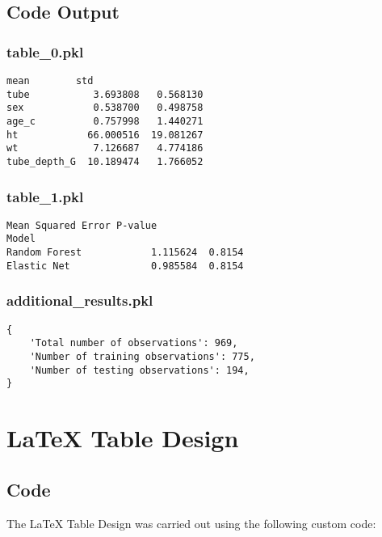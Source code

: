 \documentclass[11pt]{article}
\begin{document}
\subsection{Code Output}

\subsubsection*{table\_0.pkl}

\begin{Verbatim}[tabsize=4]
                   mean        std
tube           3.693808   0.568130
sex            0.538700   0.498758
age_c          0.757998   1.440271
ht            66.000516  19.081267
wt             7.126687   4.774186
tube_depth_G  10.189474   1.766052
\end{Verbatim}

\subsubsection*{table\_1.pkl}

\begin{Verbatim}[tabsize=4]
               Mean Squared Error P-value
Model
Random Forest            1.115624  0.8154
Elastic Net              0.985584  0.8154
\end{Verbatim}

\subsubsection*{additional\_results.pkl}

\begin{Verbatim}[tabsize=4]
{
    'Total number of observations': 969,
    'Number of training observations': 775,
    'Number of testing observations': 194,
}
\end{Verbatim}

\section{LaTeX Table Design}
\subsection{{Code}}
The LaTeX Table Design was carried out using the following custom code:
\end{document}
